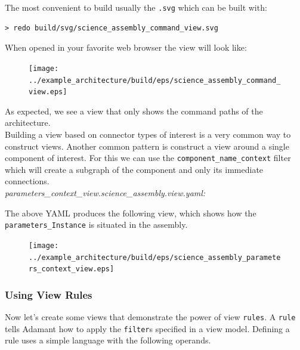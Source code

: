 The most convenient to build usually the \texttt{.svg} which can be built with:

\vspace{5mm} %
\begin{verbatim}
> redo build/svg/science_assembly_command_view.svg
\end{verbatim}
\vspace{5mm} %

When opened in your favorite web browser the view will look like:

\begin{figure}[H]
  \texttt{[image: ../example\_architecture/build/eps/science\_assembly\_command\_view.eps]}
\end{figure}

As expected, we see a view that only shows the command paths of the architecture. \\

Building a view based on connector types of interest is a very common way to construct views. Another common pattern is construct a view around a single component of interest. For this we can use the \texttt{component\_name\_context} filter which will create a subgraph of the component and only its immediate connections. \\

\textit{parameters\_context\_view.science\_assembly.view.yaml:}

The above YAML produces the following view, which shows how the \texttt{parameters\_Instance} is situated in the assembly.

\begin{figure}[H]
  \texttt{[image: ../example\_architecture/build/eps/science\_assembly\_parameters\_context\_view.eps]}
\end{figure}

\subsubsection{Using View Rules} \label{Using View Rules}

Now let's create some views that demonstrate the power of view \texttt{rules}. A \texttt{rule} tells Adamant how to apply the \texttt{filter}s specified in a view model. Defining a rule uses a simple language with the following operands.

